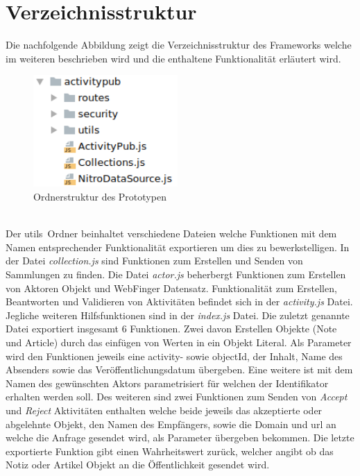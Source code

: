 \section{Verzeichnisstruktur}
Die nachfolgende Abbildung zeigt die Verzeichnisstruktur des Frameworks welche im weiteren beschrieben wird und die enthaltene Funktionalität erläutert wird.\\
\begin{figure}[h]
	\centering
	\includegraphics[width=5.5cm]{figures/activitypub-directory-structur.png}
	\caption{Ordnerstruktur des Prototypen}
	\label{fig:directory-structur}
\end{figure}\\
Der \glqq utils\grqq~Ordner beinhaltet verschiedene Dateien welche Funktionen mit dem Namen entsprechender Funktionalität exportieren um dies zu bewerkstelligen. In der Datei \textit{collection.js} sind Funktionen zum Erstellen und Senden von Sammlungen zu finden. Die Datei \textit{actor.js} beherbergt Funktionen zum Erstellen von Aktoren Objekt und WebFinger Datensatz. Funktionalität zum Erstellen, Beantworten und Validieren von Aktivitäten befindet sich in der \textit{activity.js} Datei. Jegliche weiteren Hilfsfunktionen sind in der \textit{index.js} Datei. Die zuletzt genannte Datei exportiert insgesamt 6 Funktionen. Zwei davon Erstellen Objekte (Note und Article) durch das einfügen von Werten in ein Objekt Literal. Als Parameter wird den Funktionen jeweils eine activity- sowie objectId, der Inhalt, Name des Absenders sowie das Veröffentlichungsdatum übergeben. Eine weitere ist mit dem Namen des gewünschten Aktors parametrisiert für welchen der Identifikator erhalten werden soll. Des weiteren sind zwei Funktionen zum Senden von \textit{Accept} und \textit{Reject} Aktivitäten enthalten welche beide jeweils das akzeptierte oder abgelehnte Objekt, den Namen des Empfängers, sowie die Domain und \gls{url} an welche die Anfrage gesendet wird, als Parameter übergeben bekommen. Die letzte exportierte Funktion gibt einen Wahrheitswert zurück, welcher angibt ob das Notiz oder Artikel Objekt an die Öffentlichkeit gesendet wird.\\
